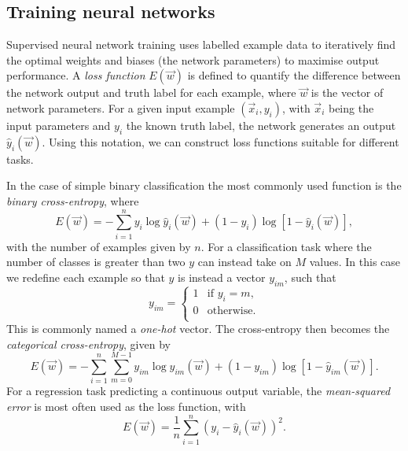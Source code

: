 \subsection{Training neural networks} %
\label{sec:cnn_theory_training} %

Supervised neural network training uses labelled example data to iteratively find the optimal
weights and biases (the network parameters) to maximise output performance. A \emph{loss function}
$E(\vec{w})$ is defined to quantify the difference between the network output and truth label for
each example, where $\vec{w}$ is the vector of network parameters. For a given input example
$(\vec{x}_{i}, y_{i})$, with $\vec{x}_{i}$ being the input parameters and $y_{i}$ the known truth
label, the network generates an output $\hat{y}_{i}(\vec{w})$. Using this notation, we can
construct loss functions suitable for different tasks.

In the case of simple binary classification the most commonly used function is the \emph{binary
cross-entropy}, where
\begin{equation} %
    E(\vec{w})=
    -\displaystyle\sum_{i=1}^{n}y_{i}\log\hat{y}_{i}(\vec{w})+
    (1-y_{i})\log[1-\hat{y}_{i}(\vec{w})],
    \label{eq:binary_cross_entropy}
\end{equation}
with the number of examples given by $n$. For a classification task where the number of classes is
greater than two $y$ can instead take on $M$ values. In this case we redefine each example so that
$y$ is instead a vector $y_{im}$, such that
\begin{equation} %
    y_{im}=
    \begin{cases}
        1 & \text{if $y_{i}=m$,} \\
        0 & \text{otherwise.}   \\
    \end{cases}
\end{equation}
This is commonly named a \emph{one-hot} vector. The cross-entropy then becomes the
\emph{categorical cross-entropy}, given by
\begin{equation} %
    E(\vec{w})=
    -\displaystyle\sum_{i=1}^{n}\displaystyle\sum_{m=0}^{M-1}y_{im}\log\hat{y}_{im}
    (\vec{w})+(1-y_{im})\log[1-\hat{y}_{im}(\vec{w})].
    \label{eq:categorical_cross_entropy}
\end{equation}
For a regression task predicting a continuous output variable, the \emph{mean-squared error} is
most often used as the loss function, with
\begin{equation} %
    E(\vec{w})=
    \frac{1}{n}\displaystyle\sum_{i=1}^{n}(y_{i}-
    \hat{y}_{i}(\vec{w}))^{2}.
    \label{eq:mse}
\end{equation}

